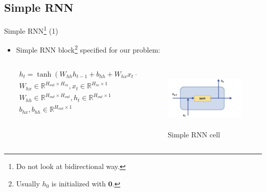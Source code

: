 \documentclass[aspectratio= 169]{beamer}
\newcommand{\R}{\mathbb{R}}
\begin{document}
		\subsection{Simple RNN}
		\begin{frame}{Simple RNN\footnote{Do not look at bidirectional way.} (1)}
			\begin{itemize}
				\item Simple RNN block\footnote{Usually $h_0$ is initialized with $\textbf{0}$.} specified for our problem:
				
				
				\begin{columns}[T]
					\begin{column}{0.45\textwidth}
						$${
							\begin{array}{l}
								h_t = \tanh{\left( W_{hh} h_{t - 1} + b_{hh} + W_{hx} x_t + b_{hx} \right)}\\
								W_{hx} \in \R^{H_{out} \times H_{in}}, x_t \in \R^{ H_{in} \times 1}\\
								W_{hh} \in \R^{H_{out} \times H_{out}}, h_{t} \in \R^{H_{out} \times 1}\\
								b_{hx}, b_{hh} \in \R^{H_{out} \times 1}
							\end{array}
						}$$
					\end{column}
					\hfill
					\begin{column}{0.45\textwidth}
						\begin{figure}[H]
							\includegraphics[width= 5cm, height= 3cm]{RNN_cell.jpg}
							\caption{Simple RNN cell}
						\end{figure}
					\end{column}
				\end{columns}				
			\end{itemize}
		\end{frame}
	
\end{document}
